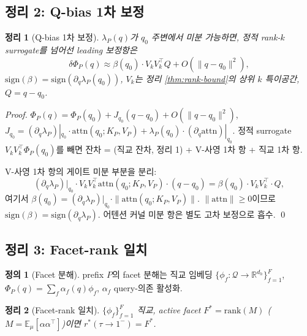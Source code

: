 \documentclass[11pt]{article}
\newtheorem{theorem}{정리}
\theoremstyle{definition}
\newtheorem{definition}{정의}
\newcommand{\R}{\mathbb{R}}
\newcommand{\E}{\mathbb{E}}
\newcommand{\Phip}{\Phi_P}
\newcommand{\dh}{d_h}
\newcommand{\attn}{\mathrm{attn}}
\begin{document}
\subsection{정리 2: Q-bias 1차 보정}
\label{sec:thm2}

\begin{theorem}[Q-bias 1차 보정]
\label{thm:qbias}
$\lambda_P(q)$가 $q_0$ 주변에서 미분 가능하면, 정적 rank-$k$ surrogate를 넘어선 leading 보정항은
\begin{equation}
\delta\Phip(q) \approx \beta(q_0)\cdot V_k V_k^\top Q + O(\|q-q_0\|^2),
\end{equation}
$\mathrm{sign}(\beta) = \mathrm{sign}(\partial_q\lambda_P(q_0))$, $V_k$는 정리 \ref{thm:rank-bound}의 상위 $k$ 특이공간, $Q = q-q_0$.
\end{theorem}

\begin{proof}
$\Phip(q) = \Phip(q_0) + J_{q_0}(q-q_0) + O(\|q-q_0\|^2)$, $J_{q_0} = (\partial_q\lambda_P)|_{q_0}\cdot\attn(q_0;K_P,V_P) + \lambda_P(q_0)\cdot(\partial_q\attn)|_{q_0}$. 정적 surrogate $V_k V_k^\top\Phip(q_0)$를 빼면 잔차 = (직교 잔차, 정리 1) + V-사영 1차 항 + 직교 1차 항.

V-사영 1차 항의 게이트 미분 부분을 분리:
\begin{equation}
(\partial_q\lambda_P)|_{q_0}\cdot V_k V_k^\top\attn(q_0;K_P,V_P)\cdot(q-q_0) = \beta(q_0)\cdot V_k V_k^\top\cdot Q,
\end{equation}
여기서 $\beta(q_0) = (\partial_q\lambda_P)|_{q_0}\cdot\|\attn(q_0;K_P,V_P)\|$. $\|\attn\|\ge 0$이므로 $\mathrm{sign}(\beta) = \mathrm{sign}(\partial_q\lambda_P)$. 어텐션 커널 미분 항은 별도 고차 보정으로 흡수.
\qed
\end{proof}

\subsection{정리 3: Facet-rank 일치}
\label{sec:thm3}

\begin{definition}[Facet 분해]
prefix $P$의 facet 분해는 직교 임베딩 $\{\phi_f: \mathcal{Q}\to\R^{\dh}\}_{f=1}^F$, $\Phip(q) = \sum_f \alpha_f(q)\phi_f$, $\alpha_f$ query-의존 활성화.
\end{definition}

\begin{theorem}[Facet-rank 일치]
\label{thm:facet-rank}
$\{\phi_f\}_{f=1}^F$ 직교, active facet $F^* = \mathrm{rank}(M)$ ($M = \E_\mu[\alpha\alpha^\top]$)이면 $r^*(\tau\to 1^-) = F^*$.
\end{theorem}
\end{document}
